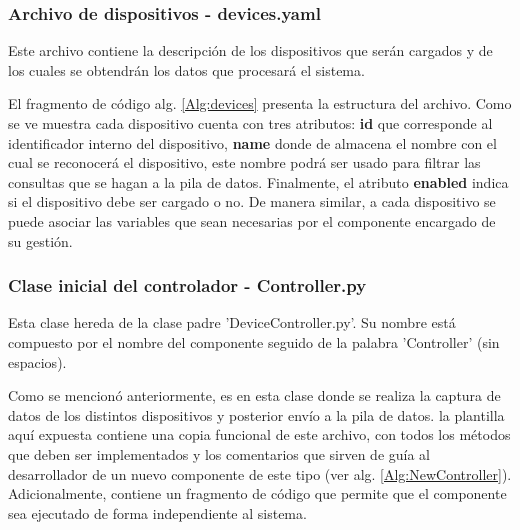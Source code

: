         \subsubsection{Archivo de dispositivos - devices.yaml}
        \label{sub2:devicesFileController}
            Este archivo contiene la descripción de los dispositivos que serán cargados y de los cuales se obtendrán los datos que procesará el sistema. 

            

            El fragmento de código alg. \ref{Alg:devices} presenta la estructura del archivo. Como se ve muestra cada dispositivo cuenta con tres atributos: \textbf{id} que corresponde al identificador interno del dispositivo, \textbf{name} donde de almacena el nombre con el cual se reconocerá el dispositivo, este nombre podrá ser usado para filtrar las consultas que se hagan a la pila de datos. Finalmente, el atributo \textbf{enabled} indica si el dispositivo debe ser cargado o no. De manera similar, a cada dispositivo se puede asociar las variables que sean necesarias por el componente encargado de su gestión.

        \subsubsection{Clase inicial del controlador - Controller.py}
        \label{sub2:classFileController}
            Esta clase hereda de la clase padre 'DeviceController.py'. Su nombre está compuesto por el nombre del componente seguido de la palabra 'Controller' (sin espacios).
            
            Como se mencionó anteriormente, es en esta clase donde se realiza la captura de datos de los distintos dispositivos y posterior envío a la pila de datos. la plantilla aquí expuesta contiene una copia funcional de este archivo, con todos los métodos que deben ser implementados y los comentarios que sirven de guía al desarrollador de un nuevo componente de este tipo (ver alg. \ref{Alg:NewController}). Adicionalmente, contiene un fragmento de código que permite que el componente sea ejecutado de forma independiente al sistema.
            
            

